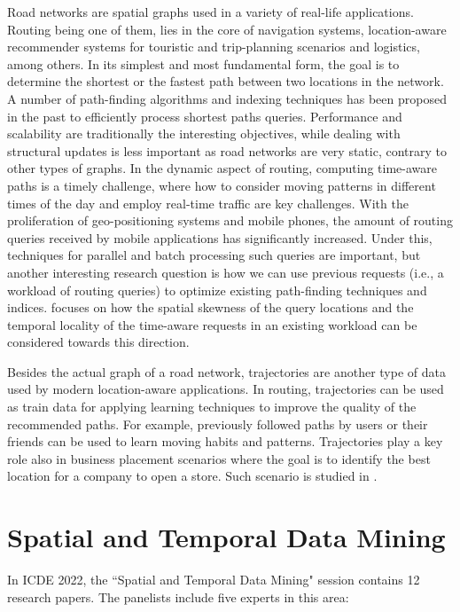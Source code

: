 \documentclass[11pt,dvipdfm]{article}
\begin{document}
Road networks are spatial graphs used in a variety of real-life applications. Routing being one of them, lies in the core of navigation systems, location-aware recommender systems for touristic and trip-planning scenarios and logistics, among others. In its simplest and most fundamental form, the goal is to determine the shortest or the fastest path between two locations in the network. A number of path-finding algorithms and indexing techniques has been proposed in the past to efficiently process shortest paths queries. Performance and scalability are traditionally the interesting objectives, while dealing with structural updates is less important as road networks are very static, contrary to other types of graphs. In the dynamic aspect of routing, computing time-aware paths is a timely challenge, where how to consider moving patterns in different times of the day and employ real-time traffic are key challenges. With the proliferation of geo-positioning systems and mobile phones, the amount of routing queries received by mobile applications has significantly increased. Under this, techniques for parallel and batch processing such queries are important, but another interesting research question is how we can use previous requests (i.e., a workload of routing  queries) to optimize existing path-finding techniques and indices. \cite{conf/icde/ZWGMHZJ2022} focuses on how the spatial skewness of the query locations and the temporal locality of the time-aware requests in an existing workload can be considered towards this direction. 

Besides the actual graph of a road network, trajectories are another type of data used by modern location-aware applications. In routing, trajectories can be used as train data for applying learning techniques to improve the quality of the recommended paths. For example, previously followed paths by users or their friends can be used to learn moving habits and patterns. Trajectories play a key role also in business placement scenarios where the goal is to identify the best location for a company to open a store. Such scenario is studied in \cite{conf/icde/ZGHCL2022}.



\section{Spatial and Temporal Data Mining}

In ICDE 2022, the ``Spatial and Temporal Data Mining" session contains 12 research papers. The panelists include five experts in this area:
\end{document}
